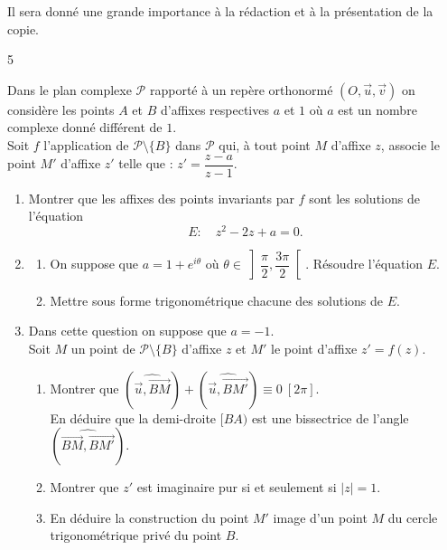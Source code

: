 \documentclass{axiobac}
\begin{document}
\entete

Il sera donné une grande importance à la rédaction et à la présentation de la copie.

\begin{exercice}{5}

Dans le plan complexe $\mathcal{P}$ rapporté à un repère orthonormé $(O, \vec{u}, \vec{v})$ on considère les points $A$ et $B$ d'affixes respectives $a$ et $1$ où $a$ est un nombre complexe donné différent de $1$. \\
Soit $f$ l'application de $\mathcal{P} \setminus \{B\}$ dans $\mathcal{P}$ qui, à tout point $M$ d'affixe $z$, associe le point $M'$ d'affixe $z'$ telle que : $z' = \dfrac{z - a}{z - 1}$.

\begin{enumerate}
    \item Montrer que les affixes des points invariants par $f$ sont les solutions de l'équation
    \[
    E : \quad z^2 - 2z + a = 0 .
    \]
    \item
    \begin{enumerate}
        \item On suppose que $a = 1 + e^{i\theta}$ où $\theta \in \left]\dfrac{\pi}{2}, \dfrac{3\pi}{2}\right[$. Résoudre l'équation $E$.
        \item Mettre sous forme trigonométrique chacune des solutions de $E$.
    \end{enumerate}
    \item Dans cette question on suppose que $a = -1$. \\
    Soit $M$ un point de $\mathcal{P} \setminus \{B\}$ d'affixe $z$ et $M'$ le point d'affixe $z' = f(z)$.
    \begin{enumerate}
        \item Montrer que $\left(\widehat{\vec{u}, \overrightarrow{BM}}\right) + \left(\widehat{\vec{u}, \overrightarrow{BM'}}\right) \equiv 0 \ [2\pi]$. \\
        En déduire que la demi-droite $[BA)$ est une bissectrice de l'angle $\left(\widehat{\overrightarrow{BM}, \overrightarrow{BM'}}\right)$.
        \item Montrer que $z'$ est imaginaire pur si et seulement si $|z| = 1$.
        \item En déduire la construction du point $M'$ image d'un point $M$ du cercle trigonométrique privé du point $B$.
    \end{enumerate}
\end{enumerate}

\end{exercice}
\end{document}

